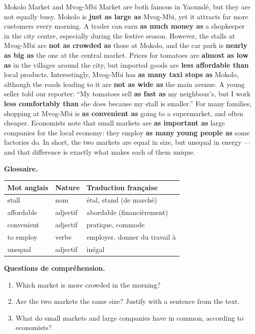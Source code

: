 \documentclass[11pt]{article}
\begin{document}
\begin{textebox}
Mokolo Market and Mvog-Mbi Market are both famous in Yaoundé, but they are not equally busy. Mokolo is \textbf{just as large as} Mvog-Mbi, yet it attracts far more customers every morning. A trader can earn \textbf{as much money as} a shopkeeper in the city centre, especially during the festive season. However, the stalls at Mvog-Mbi are \textbf{not as crowded as} those at Mokolo, and the car park is \textbf{nearly as big as} the one at the central market. Prices for tomatoes are \textbf{almost as low as} in the villages around the city, but imported goods are \textbf{less affordable than} local products. Interestingly, Mvog-Mbi has \textbf{as many taxi stops as} Mokolo, although the roads leading to it are \textbf{not as wide as} the main avenue. A young seller told our reporter: “My tomatoes sell \textbf{as fast as} my neighbour's, but I work \textbf{less comfortably than} she does because my stall is smaller.” For many families, shopping at Mvog-Mbi is \textbf{as convenient as} going to a supermarket, and often cheaper. Economists note that small markets are \textbf{as important as} large companies for the local economy: they employ \textbf{as many young people as} some factories do. In short, the two markets are equal in size, but unequal in energy — and that difference is exactly what makes each of them unique.
\end{textebox}

\textbf{Glossaire.}

\begin{center}
\begin{tabularx}{\linewidth}{|l|l|X|}
\hline
\rowcolor{popblueL} Mot anglais & Nature & Traduction française \\
\hline
stall & nom & étal, stand (de marché) \\
\hline
affordable & adjectif & abordable (financièrement) \\
\hline
convenient & adjectif & pratique, commode \\
\hline
to employ & verbe & employer, donner du travail à \\
\hline
unequal & adjectif & inégal \\
\hline
\end{tabularx}
\end{center}

\textbf{Questions de compréhension.}
\begin{enumerate}
\item Which market is more crowded in the morning?
\item Are the two markets the same size? Justify with a sentence from the text.
\item What do small markets and large companies have in common, according to economists?
\end{enumerate}
\end{document}
